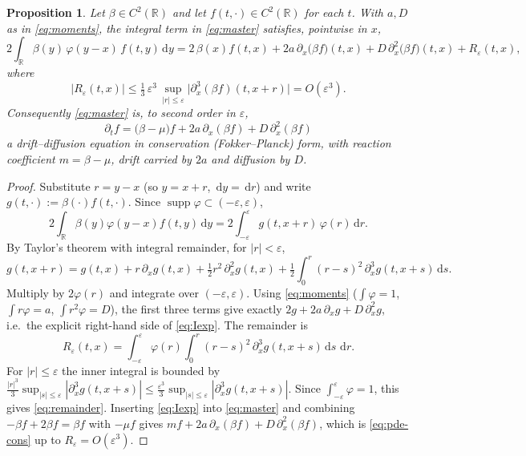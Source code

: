 \documentclass{amsart}
\newtheorem{proposition}{Proposition}
\theoremstyle{definition}
\newcommand{\R}{\mathbb{R}}
\newcommand{\dd}{\,\mathrm{d}}
\DeclareMathOperator{\supp}{supp}
\begin{document}
\begin{proposition}\label{prop:expansion}
Let $\beta\in C^2(\R)$ and let $f(t,\cdot)\in C^2(\R)$ for each $t$. With $a,D$ as in
\eqref{eq:moments}, the integral term in \eqref{eq:master} satisfies, pointwise in $x$,
\begin{equation}\label{eq:Iexp}
2\int_\R \beta(y)\,\varphi(y-x)\,f(t,y)\dd y
= 2\,\beta(x)f(t,x) + 2a\,\partial_x\!\bigl(\beta f\bigr)(t,x)
+ D\,\partial_x^2\!\bigl(\beta f\bigr)(t,x) + R_\varepsilon(t,x),
\end{equation}
where
\begin{equation}\label{eq:remainder}
|R_\varepsilon(t,x)| \le \tfrac{1}{3}\,\varepsilon^3\,
\sup_{|r|\le\varepsilon}\bigl|\partial_x^3(\beta f)(t,x+r)\bigr|
= O(\varepsilon^3).
\end{equation}
Consequently \eqref{eq:master} is, to second order in $\varepsilon$,
\begin{equation}\label{eq:pde-cons}
\boxed{\;\partial_t f = \bigl(\beta-\mu\bigr) f + 2a\,\partial_x(\beta f) + D\,\partial_x^2(\beta f)\;}
\end{equation}
a drift--diffusion equation in conservation (Fokker--Planck) form, with reaction
coefficient $m=\beta-\mu$, drift carried by $2a$ and diffusion by $D$.
\end{proposition}

\begin{proof}
Substitute $r=y-x$ (so $y=x+r$, $\dd y=\dd r$) and write $g(t,\cdot):=\beta(\cdot)f(t,\cdot)$.
Since $\supp\varphi\subset(-\varepsilon,\varepsilon)$,
\[
2\int_\R \beta(y)\varphi(y-x)f(t,y)\dd y
= 2\int_{-\varepsilon}^{\varepsilon} g(t,x+r)\,\varphi(r)\dd r .
\]
By Taylor's theorem with integral remainder, for $|r|<\varepsilon$,
\[
g(t,x+r)= g(t,x) + r\,\partial_x g(t,x) + \tfrac12 r^2\,\partial_x^2 g(t,x)
+ \tfrac12\int_0^r (r-s)^2\,\partial_x^3 g(t,x+s)\dd s .
\]
Multiply by $2\varphi(r)$ and integrate over $(-\varepsilon,\varepsilon)$. Using
\eqref{eq:moments} ($\int\varphi=1$, $\int r\varphi=a$, $\int r^2\varphi=D$), the first three
terms give exactly $2g + 2a\,\partial_x g + D\,\partial_x^2 g$, i.e.\ the explicit right-hand
side of \eqref{eq:Iexp}. The remainder is
\[
R_\varepsilon(t,x)= \int_{-\varepsilon}^{\varepsilon}\!\varphi(r)\!\int_0^r (r-s)^2\,\partial_x^3 g(t,x+s)\dd s\,\dd r .
\]
For $|r|\le\varepsilon$ the inner integral is bounded by
$\frac{|r|^3}{3}\sup_{|s|\le\varepsilon}|\partial_x^3 g(t,x+s)|\le
\frac{\varepsilon^3}{3}\sup_{|s|\le\varepsilon}|\partial_x^3 g(t,x+s)|$. Since
$\int_{-\varepsilon}^\varepsilon \varphi=1$, this gives \eqref{eq:remainder}. Inserting
\eqref{eq:Iexp} into \eqref{eq:master} and combining $-\beta f + 2\beta f=\beta f$ with
$-\mu f$ gives $m f + 2a\,\partial_x(\beta f)+D\,\partial_x^2(\beta f)$, which is
\eqref{eq:pde-cons} up to $R_\varepsilon=O(\varepsilon^3)$.
\end{proof}
\end{document}
